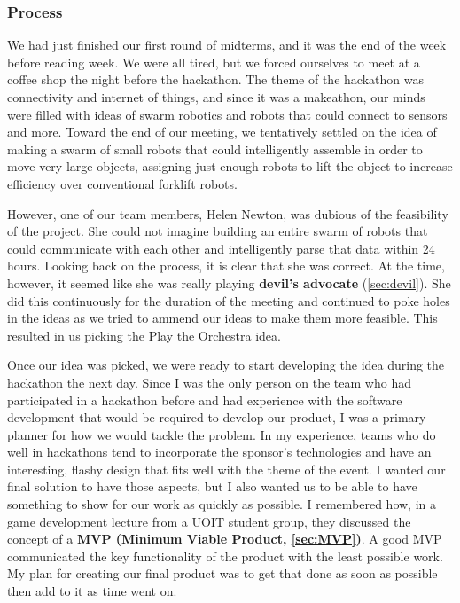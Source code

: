 \documentclass[a4paper,12pt]{article}
\begin{document}
\subsubsection{Process}
We had just finished our first round of midterms, and it was the end of the week before reading week. We were all tired, but we forced ourselves to meet at a coffee shop the night before the hackathon. The theme of the hackathon was connectivity and internet of things, and since it was a makeathon, our minds were filled with ideas of swarm robotics and robots that could connect to sensors and more. Toward the end of our meeting, we tentatively settled on the idea of making a swarm of small robots that could intelligently assemble in order to move very large objects, assigning just enough robots to lift the object to increase efficiency over conventional forklift robots.

However, one of our team members, Helen Newton, was dubious of the feasibility of the project. She could not imagine building an entire swarm of robots that could communicate with each other and intelligently parse that data within 24 hours. Looking back on the process, it is clear that she was correct. At the time, however, it seemed like she was really playing \textbf{devil’s advocate} (\ref{sec:devil}). She did this continuously for the duration of the meeting and continued to poke holes in the ideas as we tried to ammend our ideas to make them more feasible. This resulted in us picking the Play the Orchestra idea.

Once our idea was picked, we were ready to start developing the idea during the hackathon the next day. Since I was the only person on the team who had participated in a hackathon before and had experience with the software development that would be required to develop our product, I was a primary planner for how we would tackle the problem. In my experience, teams who do well in hackathons tend to incorporate the sponsor’s technologies and have an interesting, flashy design that fits well with the theme of the event. I wanted our final solution to have those aspects, but I also wanted us to be able to have something to show for our work as quickly as possible. I remembered how, in a game development lecture from a UOIT student group, they discussed the concept of a \textbf{MVP (Minimum Viable Product, \ref{sec:MVP})}. A good MVP communicated the key functionality of the product with the least possible work. My plan for creating our final product was to get that done as soon as possible then add to it as time went on.
\end{document}
